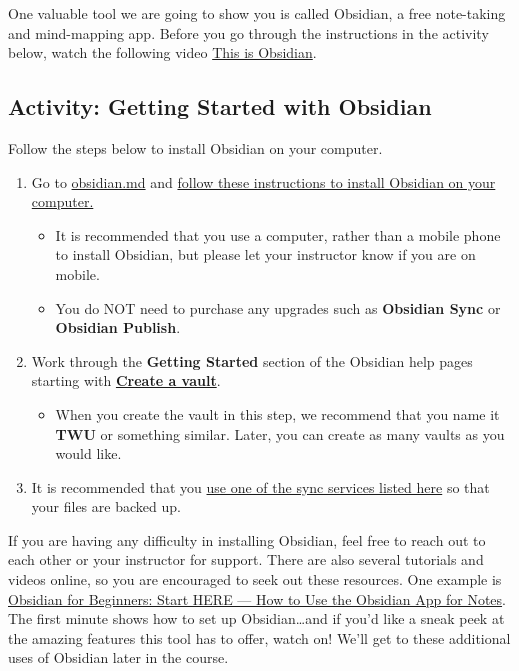 \documentclass[
]{book}
\providecommand{\tightlist}{%
  \setlength{\itemsep}{0pt}\setlength{\parskip}{0pt}}
\begin{document}
One valuable tool we are going to show you is called Obsidian, a free note-taking and mind-mapping app. Before you go through the instructions in the activity below, watch the following video \href{https://www.youtube.com/watch?v=d2FNqEDGc8g}{This is Obsidian}.

\hypertarget{activity-getting-started-with-obsidian}{%
\subsection*{Activity: Getting Started with Obsidian}\label{activity-getting-started-with-obsidian}}

\begin{reflect}
Follow the steps below to install Obsidian on your computer.

\begin{enumerate}
\def\labelenumi{\arabic{enumi}.}
\tightlist
\item
  Go to \href{https://obsidian.md/download}{obsidian.md} and \href{https://help.obsidian.md/Getting+started/Download+and+install+Obsidian}{follow these instructions to install Obsidian on your computer.}

  \begin{itemize}
  \tightlist
  \item
    It is recommended that you use a computer, rather than a mobile phone to install Obsidian, but please let your instructor know if you are on mobile.
  \item
    You do NOT need to purchase any upgrades such as \textbf{Obsidian Sync} or \textbf{Obsidian Publish}.
  \end{itemize}
\item
  Work through the \textbf{Getting Started} section of the Obsidian help pages starting with \textbf{\href{https://help.obsidian.md/Getting+started/Create+a+vault}{Create a vault}}.

  \begin{itemize}
  \tightlist
  \item
    When you create the vault in this step, we recommend that you name it \textbf{TWU} or something similar. Later, you can create as many vaults as you would like.
  \end{itemize}
\item
  It is recommended that you \href{https://help.obsidian.md/Getting+started/Sync+your+notes+across+devices}{use one of the sync services listed here} so that your files are backed up.
\end{enumerate}

If you are having any difficulty in installing Obsidian, feel free to reach out to each other or your instructor for support. There are also several tutorials and videos online, so you are encouraged to seek out these resources. One example is \href{https://www.youtube.com/watch?v=QgbLb6QCK88}{Obsidian for Beginners: Start HERE --- How to Use the Obsidian App for Notes}. The first minute shows how to set up Obsidian\ldots and if you'd like a sneak peek at the amazing features this tool has to offer, watch on! We'll get to these additional uses of Obsidian later in the course.
\end{reflect}
\end{document}

